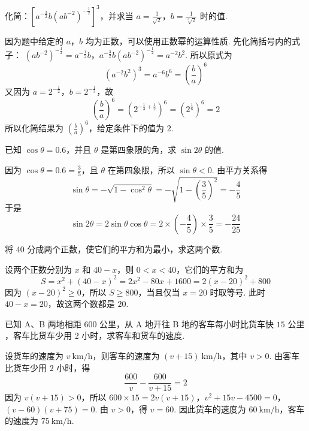 \begin{problem}
化简：\( \left[a^{-\frac{3}{2}}b\left(ab^{-2}\right)^{-\frac{1}{2}}\right]^3 \)，并求当 \(a=\frac{1}{\sqrt{2}}\)，\(b=\frac{1}{\sqrt[3]{2}}\) 时的值.
\end{problem}

\begin{solution}
因为题中给定的 \(a\)，\(b\) 均为正数，可以使用正数幂的运算性质. 先化简括号内的式子：
\(\left(ab^{-2}\right)^{-\frac{1}{2}}=a^{-\frac{1}{2}}b\)，\(a^{-\frac{3}{2}}b\left(ab^{-2}\right)^{-\frac{1}{2}}=a^{-2}b^2\).
所以原式为
\[
\left(a^{-2}b^2\right)^3=a^{-6}b^6=\left(\frac{b}{a}\right)^6
\]
又因为 \(a=2^{-\frac{1}{2}}\)，\(b=2^{-\frac{1}{3}}\)，故
\[
\left(\frac{b}{a}\right)^6
=\left(2^{-\frac{1}{3}+\frac{1}{2}}\right)^6
=\left(2^{\frac{1}{6}}\right)^6=2
\]
所以化简结果为 \(\left(\frac{b}{a}\right)^6\)，给定条件下的值为 \(2\).
\end{solution}

\begin{problem}
已知 \(\cos\theta=0.6\)，并且 \(\theta\) 是第四象限的角，求 \(\sin2\theta\) 的值.
\end{problem}

\begin{solution}
因为 \(\cos\theta=0.6=\frac{3}{5}\)，且 \(\theta\) 在第四象限，所以 \(\sin\theta<0\). 由平方关系得
\[
\sin\theta=-\sqrt{1-\cos^2\theta}=-\sqrt{1-\left(\frac{3}{5}\right)^2}=-\frac{4}{5}
\]
于是
\[
\sin2\theta=2\sin\theta\cos\theta=2\times\left(-\frac{4}{5}\right)\times\frac{3}{5}=-\frac{24}{25}
\]
\end{solution}

\begin{problem}
将 \(40\) 分成两个正数，使它们的平方和为最小，求这两个数.
\end{problem}

\begin{solution}
设两个正数分别为 \(x\) 和 \(40-x\)，则 \(0<x<40\)，它们的平方和为
\[
S=x^2+(40-x)^2=2x^2-80x+1600=2(x-20)^2+800
\]
因为 \((x-20)^2\geqslant0\)，所以 \(S\geqslant800\)，当且仅当 \(x=20\) 时取等号. 此时 \(40-x=20\)，故这两个数都是 \(20\).
\end{solution}

\begin{problem}
已知 A、B 两地相距 \(600\text{ 公里}\)，从 A 地开往 B 地的客车每小时比货车快 \(15\text{ 公里}\)，客车比货车少用 \(2\) 小时，求客车和货车的速度.
\end{problem}

\begin{solution}
设货车的速度为 \(v\mathrm{~km/h}\)，则客车的速度为 \((v+15)\mathrm{~km/h}\)，其中 \(v>0\). 由客车比货车少用 \(2\) 小时，得
\[
\frac{600}{v}-\frac{600}{v+15}=2
\]
因为 \(v(v+15)>0\)，所以
\(600\times15=2v(v+15)\)，\(v^2+15v-4500=0\)，\((v-60)(v+75)=0\).
由 \(v>0\)，得 \(v=60\). 因此货车的速度为 \(60\mathrm{~km/h}\)，客车的速度为 \(75\mathrm{~km/h}\).
\end{solution}

